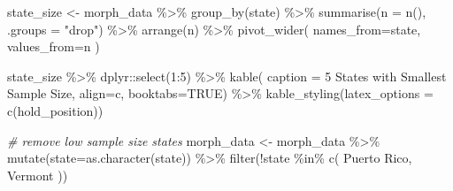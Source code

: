 \documentclass[
  11pt,
]{article}
\newenvironment{Shaded}{\begin{snugshade}}{\end{snugshade}}
\newcommand{\AttributeTok}[1]{\textcolor[rgb]{0.77,0.63,0.00}{#1}}
\newcommand{\CommentTok}[1]{\textcolor[rgb]{0.56,0.35,0.01}{\textit{#1}}}
\newcommand{\ConstantTok}[1]{\textcolor[rgb]{0.00,0.00,0.00}{#1}}
\newcommand{\DecValTok}[1]{\textcolor[rgb]{0.00,0.00,0.81}{#1}}
\newcommand{\FunctionTok}[1]{\textcolor[rgb]{0.00,0.00,0.00}{#1}}
\newcommand{\NormalTok}[1]{#1}
\newcommand{\OtherTok}[1]{\textcolor[rgb]{0.56,0.35,0.01}{#1}}
\newcommand{\SpecialCharTok}[1]{\textcolor[rgb]{0.00,0.00,0.00}{#1}}
\newcommand{\StringTok}[1]{\textcolor[rgb]{0.31,0.60,0.02}{#1}}
\begin{document}
\begin{Shaded}
\end{Shaded}

\begin{Shaded}
\begin{Highlighting}[]
\NormalTok{state\_size }\OtherTok{\textless{}{-}}\NormalTok{ morph\_data }\SpecialCharTok{\%\textgreater{}\%}
  \FunctionTok{group\_by}\NormalTok{(state) }\SpecialCharTok{\%\textgreater{}\%}
  \FunctionTok{summarise}\NormalTok{(}\AttributeTok{n =} \FunctionTok{n}\NormalTok{(), }\AttributeTok{.groups =} \StringTok{"drop"}\NormalTok{)  }\SpecialCharTok{\%\textgreater{}\%}
  \FunctionTok{arrange}\NormalTok{(n) }\SpecialCharTok{\%\textgreater{}\%}
  \FunctionTok{pivot\_wider}\NormalTok{(}
    \AttributeTok{names\_from=}\NormalTok{state,}
    \AttributeTok{values\_from=}\NormalTok{n}
\NormalTok{  )}

\NormalTok{state\_size }\SpecialCharTok{\%\textgreater{}\%} 
\NormalTok{  dplyr}\SpecialCharTok{::}\FunctionTok{select}\NormalTok{(}\DecValTok{1}\SpecialCharTok{:}\DecValTok{5}\NormalTok{) }\SpecialCharTok{\%\textgreater{}\%}
  \FunctionTok{kable}\NormalTok{(}
    \AttributeTok{caption =} \StringTok{\textquotesingle{}5 States with Smallest Sample Size\textquotesingle{}}\NormalTok{,}
    \AttributeTok{align=}\StringTok{\textquotesingle{}c\textquotesingle{}}\NormalTok{, }
    \AttributeTok{booktabs=}\ConstantTok{TRUE}\NormalTok{) }\SpecialCharTok{\%\textgreater{}\%}
  \FunctionTok{kable\_styling}\NormalTok{(}\AttributeTok{latex\_options =} \FunctionTok{c}\NormalTok{(}\StringTok{\textquotesingle{}hold\_position\textquotesingle{}}\NormalTok{))}
\end{Highlighting}
\end{Shaded}

\begin{Shaded}
\begin{Highlighting}[]
\CommentTok{\# remove low sample size states}
\NormalTok{morph\_data }\OtherTok{\textless{}{-}}\NormalTok{ morph\_data }\SpecialCharTok{\%\textgreater{}\%}
  \FunctionTok{mutate}\NormalTok{(}\AttributeTok{state=}\FunctionTok{as.character}\NormalTok{(state)) }\SpecialCharTok{\%\textgreater{}\%}
  \FunctionTok{filter}\NormalTok{(}\SpecialCharTok{!}\NormalTok{state }\SpecialCharTok{\%in\%} \FunctionTok{c}\NormalTok{(}
    \StringTok{\textquotesingle{}Puerto Rico\textquotesingle{}}\NormalTok{, }\StringTok{\textquotesingle{}Vermont\textquotesingle{}}
\NormalTok{  ))}
\end{Highlighting}
\end{Shaded}
\end{document}
